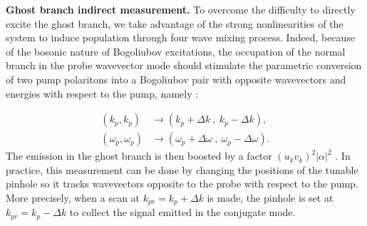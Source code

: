 \bigskip

 \textbf{Ghost branch indirect measurement.} To overcome the difficulty to directly excite the ghost branch, we take advantage of the strong nonlinearities of the system to induce population
 through four wave mixing process. Indeed, because of the bosonic nature of Bogoliubov excitations, the occupation of the normal branch in the probe wavevector mode should stimulate the parametric conversion of two pump polaritons into a Bogoliubov pair with opposite wavevectors and energies with respect to the pump, namely :

 \begin{subequations}
    \begin{align}
    (k_p, k_p) &\rightarrow (k_p+\Delta k \ ,\ k_p-\Delta k),\\
    (\omega_p, \omega_p) &\rightarrow (\omega_p+\Delta \omega \ , \ \omega_p- \Delta \omega).
    \end{align}
 \end{subequations}
The emission in the ghost branch is then boosted by a factor $(u_kv_k)^2|\alpha|^2$ \cite{I_frerot_PRX_2023}. In practice, this measurement
can be done by changing the positions of the tunable pinhole so it tracks wavevectors opposite to the probe with respect to the pump. More precisely,
when a scan at $k_{pr}=k_p+\Delta k$ is made, the pinhole is set at $k_{pr}=k_p-\Delta k$ to collect the signal emitted in the conjugate mode. 

\bigskip

